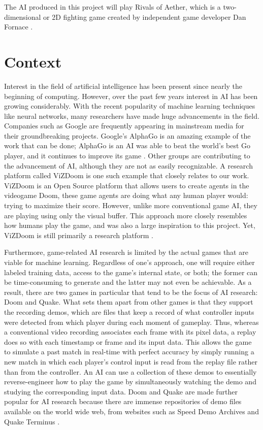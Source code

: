  The AI produced in this project will play Rivals of Aether, which is a two-dimensional or 2D fighting game created by independent game developer Dan Fornace \cite{RivalsofAether}.




\section{Context}

Interest in the field of artificial intelligence has been present since nearly the beginning of computing. However, over the past few years interest in AI has been growing considerably. With the recent popularity of machine learning techniques like neural networks, many researchers have made huge advancements in the field. Companies such as Google are frequently appearing in mainstream media for their groundbreaking projects. Google's AlphaGo is an amazing example of the work that can be done; AlphaGo is an AI was able to beat the world's best Go player, and it continues to improve its game \cite{AlphaGo}. Other groups are contributing to the advancement of AI, although they are not as easily recognizable. A research platform called ViZDoom is one such example that closely relates to our work. ViZDoom is an Open Source platform that allows users to create agents in the videogame Doom, these game agents are doing what any human player would: trying to maximize their score. However, unlike more conventional game AI, they are playing using only the visual buffer. This approach more closely resembles how humans play the game, and was also a large inspiration to this project. Yet, ViZDoom is still primarily a research platform \cite{Kempka:2016}.

Furthermore, game-related AI research is limited by the actual games that are viable for machine learning. Regardless of one's approach, one will require either labeled training data, access to the game's internal state, or both; the former can be time-consuming to generate and the latter may not even be achievable. As a result, there are two games in particular that tend to be the focus of AI research: Doom and Quake. What sets them apart from other games is that they support the recording demos, which are files that keep a record of what controller inputs were detected from which player during each moment of gameplay. Thus, whereas a conventional video recording associates each frame with its pixel data, a replay does so with each timestamp or frame and its input data. This allows the game to simulate a past match in real-time with perfect accuracy by simply running a new match in which each player's control input is read from the replay file rather than from the controller. An AI can use a collection of these demos to essentially reverse-engineer how to play the game by simultaneously watching the demo and studying the corresponding input data. Doom and Quake are made further popular for AI research because there are immense repositories of demo files available on the world wide web, from websites such as Speed Demo Archives and Quake Terminus \cite{Thurau:2004}.

